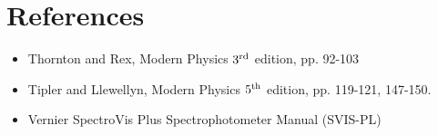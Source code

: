 \documentclass{article}
\begin{document}
%
%
%
%
%
%
%
%
%
%
%
%
%
%
%
%

\section{References}

\begin{itemize}
\item Thornton and Rex, Modern Physics $3^{\rm rd}$ edition, pp. 92-103
\item Tipler and Llewellyn, Modern Physics $5^{\rm th}$ edition, pp. 119-121, 147-150.
\item Vernier SpectroVis Plus Spectrophotometer Manual (SVIS-PL)
\end{itemize}
\end{document}
